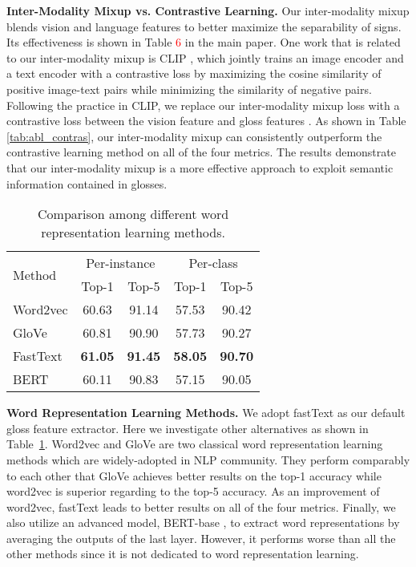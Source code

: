\documentclass[10pt,twocolumn,letterpaper]{article}
\def \tbf{\textbf}
\begin{document}
\noindent\textbf{Inter-Modality Mixup vs. Contrastive Learning.} Our inter-modality mixup blends vision and language features to better maximize the separability of signs.
Its effectiveness is shown in Table \textcolor{red}{6} in the main paper. One work that is related to our inter-modality mixup is CLIP \cite{clip}, which jointly trains an image encoder and a text encoder with a contrastive loss by maximizing the cosine similarity of positive image-text pairs while minimizing the similarity of negative pairs.
Following the practice in CLIP, we replace our inter-modality mixup loss  with a contrastive loss between the vision feature  and gloss features .
As shown in Table \ref{tab:abl_contras}, our inter-modality mixup can consistently outperform the contrastive learning method on all of the four metrics. The results demonstrate that our inter-modality mixup is a more effective approach to exploit semantic information contained in glosses.



\begin{table}[t]
\centering
\begin{tabular}{l|cc|cc}
\toprule
\multirow{2}{*}{Method} &  \multicolumn{2}{c|}{Per-instance} & \multicolumn{2}{c}{Per-class} \\
& Top-1 & Top-5 & Top-1 & Top-5 \\

\midrule
Word2vec \cite{word2vec} & 60.63 & 91.14 & 57.53 & 90.42 \\
GloVe \cite{glove} & 60.81 & 90.90 & 57.73 & 90.27 \\
FastText \cite{mikolov2018advances} & \tbf{61.05} & \tbf{91.45} & \tbf{58.05} & \tbf{90.70} \\
BERT \cite{kenton2019bert} & 60.11 & 90.83 & 57.15 & 90.05 \\

\bottomrule
\end{tabular}
\caption{Comparison among different word representation learning methods.}
\label{tab:abl_word}
\end{table}

\noindent\textbf{Word Representation Learning Methods.} We adopt fastText \cite{mikolov2018advances} as our default gloss feature extractor. Here we investigate other alternatives as shown in Table~\ref{tab:abl_word}. Word2vec \cite{word2vec} and GloVe \cite{glove} are two classical word representation learning methods which are widely-adopted in NLP community. They perform comparably to each other that GloVe achieves better results on the top-1 accuracy while word2vec is superior regarding to the top-5 accuracy. As an improvement of word2vec, fastText leads to better results on all of the four metrics. Finally, we also utilize an advanced model, BERT-base \cite{kenton2019bert}, to extract word representations by averaging the outputs of the last layer. However, it performs worse than all the other methods since it is not dedicated to word representation learning.
\end{document}
